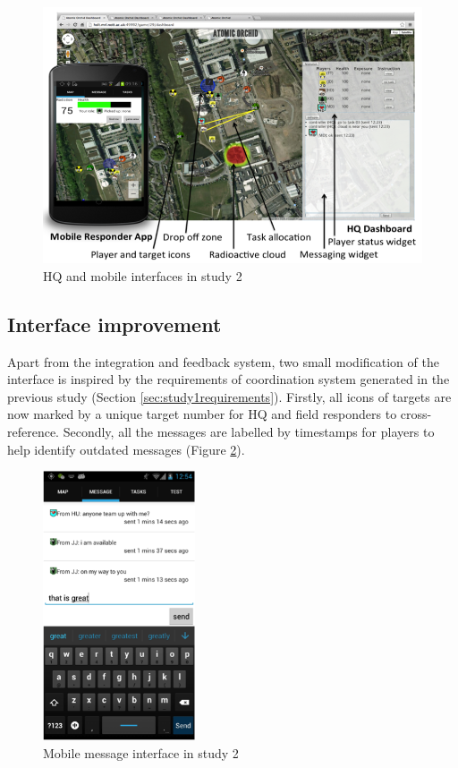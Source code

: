 \begin{figure}[h]
  \centering
  \includegraphics[width=1\textwidth]{img/study2/system/HQ}
  \caption{HQ and mobile interfaces in study 2}
  \label{fig:study2HQ}
\end{figure}


\subsection{Interface improvement}\label{sec:studytwointerface}
Apart from the integration and feedback system, two small modification of the interface is inspired by the requirements of coordination system generated in the previous study (Section \ref{sec:study1requirements}). Firstly, all icons of targets are now marked by a unique target number for HQ and field responders to cross-reference. Secondly, all the messages are labelled by timestamps for players to help identify outdated messages (Figure \ref{fig:study2mobilemsg}).\\

\begin{figure}[h]
  \centering
  \includegraphics[width=0.4\textwidth]{img/study2/system/mobilemsg}
  \caption{Mobile message interface in study 2}
  \label{fig:study2mobilemsg}
\end{figure}

